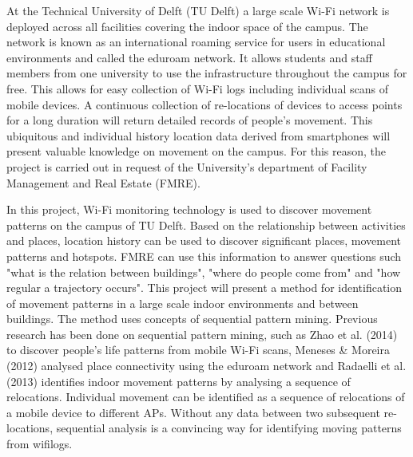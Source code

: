 At the Technical University of Delft (TU Delft) a large scale Wi-Fi network is deployed across all facilities covering the indoor space of the campus. The network is known as an international roaming service for users in educational environments and called the eduroam network. It allows students and staff members from one university to use the infrastructure throughout the campus for free. This allows for easy collection of Wi-Fi logs including individual scans of mobile devices.  A continuous collection of re-locations of devices to access points for a long duration will return detailed records of people’s movement. This ubiquitous and individual history location data derived from smartphones will present valuable knowledge on movement on the campus. For this reason, the project is carried out in request of the University’s department of Facility Management and Real Estate (FMRE). 

In this project, Wi-Fi monitoring technology is used to discover movement
patterns on the campus of TU Delft. Based on the relationship between activities and places, location history can be used to discover significant places, movement patterns and hotspots. FMRE can use this information to answer questions such "what is the relation between buildings", "where do people come from" and "how regular a trajectory occurs". This project will present a method for identification of movement patterns in a large scale indoor environments and between buildings. The method uses concepts of sequential pattern mining. Previous research has been done on sequential pattern mining, such as Zhao et al. (2014) to discover people’s life patterns from mobile Wi-Fi scans, Meneses \& Moreira (2012) analysed place connectivity using the eduroam network and Radaelli et al. (2013) identifies indoor movement patterns by analysing a sequence of relocations. Individual movement can be identified as a sequence of relocations of a mobile device to different APs. Without any data between two subsequent re-locations, sequential analysis is a convincing way for identifying moving patterns from wifilogs.

